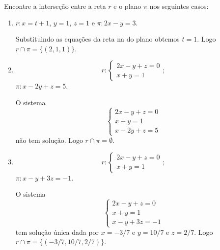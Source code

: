 \begin{exemplos}
    Encontre a interseção entre a reta $r$ e o plano $\pi$ nos seguintes casos:
    \begin{enumerate}
        \item $r: x = t + 1$, $y = 1$, $z = 1$ e $\pi : 2x - y = 3$.
        \begin{solucao}
            Substituindo as equações da reta na do plano obtemos $t = 1$. Logo $r\cap\pi = \{(2,1,1)\}$.
        \end{solucao}
        \item
        \[
            r: \begin{cases}
                2x - y + z = 0\\
                x + y = 1
            \end{cases};
        \]
        $\pi : x - 2y + z = 5$.
        \begin{solucao}
            O sistema
            \[
                \begin{cases}
                    2x - y + z = 0\\
                    x + y = 1\\
                    x - 2y + z = 5
                \end{cases}
            \]
            não tem solução. Logo $r\cap\pi = \emptyset$.
        \end{solucao}
        \item
        \[
            r: \begin{cases}
                2x - y + z = 0\\
                x + y = 1
            \end{cases};
        \]
        $\pi : x - y + 3z = -1$.
        \begin{solucao}
            O sistema
            \[
                \begin{cases}
                    2x - y + z = 0\\
                    x + y = 1\\
                    x - y + 3z = -1
                \end{cases}
            \]
            tem solução \'unica dada por $x = -3/7$ e $y = 10/7$ e $z = 2/7$. Logo $r\cap\pi = \{(-3/7, 10/7, 2/7)\}$.
        \end{solucao}
    \end{enumerate}
\end{exemplos}


